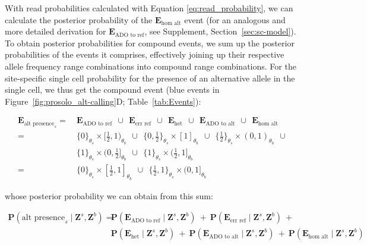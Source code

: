 \documentclass[12pt,inline]{wlscirep}
\newcommand{\Prob}{{\mathbf{P}}}
\begin{document}
With read probabilities calculated with Equation \ref{eq:read_probability}, we can calculate the posterior probability of the $\boldsymbol{E}_{\text{hom alt}}$ event (for an analogous and more detailed derivation for $\boldsymbol{E}_{\text{ADO to ref}}$, see Supplement, Section~\ref{sec:sc-model}).
To obtain posterior probabilities for compound events, we sum up the posterior probabilities of the events it comprises, effectively joining up their respective allele frequency range combinations into compound range combinations.
For the site-specific single cell probability for the presence of an alternative allele in the single cell, we thus get the compound event (blue events in Figure~\ref{fig:prosolo_alt-calling}D; Table~\ref{tab:Events}):

\begin{equation}
 \label{eq:compound-event-alt-presence}
 \begin{split}
  \boldsymbol{E}_{\text{alt presence}_s}
  =~&\boldsymbol{E}_\text{ADO to ref}~~\cup~~
    \boldsymbol{E}_\text{err ref}~~\cup~~
    \boldsymbol{E}_\text{het}~~\cup~~
    \boldsymbol{E}_\text{ADO to alt}~~\cup~~
    \boldsymbol{E}_\text{hom alt} \\
  =~&\{0\}_{\theta_s} \times [\frac{1}{2}, 1)_{\theta_b}~~\cup~~
    \{0, \frac{1}{2}\}_{\theta_s} \times [1]_{\theta_b}~~\cup~~
    \{\frac{1}{2}\}_{\theta_s} \times (0,1)_{\theta_b}~~\cup~~\\
    &\{1\}_{\theta_s} \times (0,\frac{1}{2}]_{\theta_b}~~\cup~~
    \{1\}_{\theta_s} \times (\frac{1}{2},1]_{\theta_b} \\
  =~&\{0\}_{\theta_s} \times [\frac{1}{2},1]_{\theta_b}~~\cup~~
    \{\frac{1}{2},1\}_{\theta_s} \times (0,1]_{\theta_b}
 \end{split}
\end{equation}

whose posterior probability we can obtain from this sum:

\begin{equation}
 \label{eq:alt-posterior-prob}
 \begin{split}
  \Prob(\text{alt presence}_s \mid \boldsymbol{Z}^s,\boldsymbol{Z}^b) =~&
    \Prob(\boldsymbol{E}_{\text{ADO to ref}} \mid \boldsymbol{Z}^s,\boldsymbol{Z}^b)~+~ 
    \Prob(\boldsymbol{E}_{\text{err ref}} \mid \boldsymbol{Z}^s,\boldsymbol{Z}^b)~+ \\
  &\Prob(\boldsymbol{E}_{\text{het}} \mid \boldsymbol{Z}^s,\boldsymbol{Z}^b)~+~
  \Prob(\boldsymbol{E}_{\text{ADO to alt}} \mid \boldsymbol{Z}^s,\boldsymbol{Z}^b)~+~
  \Prob(\boldsymbol{E}_{\text{hom alt}} \mid \boldsymbol{Z}^s,\boldsymbol{Z}^b)
 \end{split}
\end{equation}
\end{document}
